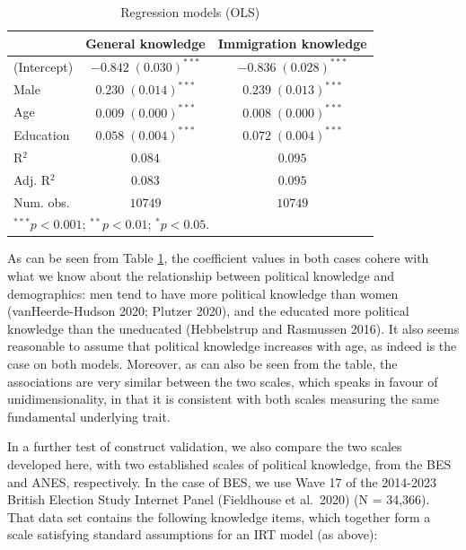 \documentclass[11pt,halfline,a4paper,]{ouparticle}
\begin{document}
\begin{table}[h!]
\caption{Regression models (OLS)}
\begin{center}
\begin{tabular}{l c c}
\hline
 & General knowledge & Immigration knowledge \\
\hline
(Intercept) & $-0.842 \; (0.030)^{***}$ & $-0.836 \; (0.028)^{***}$ \\
Male        & $0.230 \; (0.014)^{***}$  & $0.239 \; (0.013)^{***}$  \\
Age         & $0.009 \; (0.000)^{***}$  & $0.008 \; (0.000)^{***}$  \\
Education   & $0.058 \; (0.004)^{***}$  & $0.072 \; (0.004)^{***}$  \\
\hline
R$^2$       & $0.084$                   & $0.095$                   \\
Adj. R$^2$  & $0.083$                   & $0.095$                   \\
Num. obs.   & $10749$                   & $10749$                   \\
\hline
\multicolumn{3}{l}{\scriptsize{$^{***}p<0.001$; $^{**}p<0.01$; $^{*}p<0.05$.}}
\end{tabular}
\label{tab:4}
\end{center}
\end{table}

As can be seen from Table \ref{tab:4}, the coefficient values in both
cases cohere with what we know about the relationship between political
knowledge and demographics: men tend to have more political knowledge
than women (vanHeerde-Hudson 2020; Plutzer 2020), and the educated more
political knowledge than the uneducated (Hebbelstrup and Rasmussen
2016). It also seems reasonable to assume that political knowledge
increases with age, as indeed is the case on both models. Moreover, as
can also be seen from the table, the associations are very similar
between the two scales, which speaks in favour of unidimensionality, in
that it is consistent with both scales measuring the same fundamental
underlying trait.

In a further test of construct validation, we also compare the two
scales developed here, with two established scales of political
knowledge, from the BES and ANES, respectively. In the case of BES, we
use Wave 17 of the 2014-2023 British Election Study Internet Panel
(Fieldhouse et al.~2020) (N = 34,366). That data set contains the
following knowledge items, which together form a scale satisfying
standard assumptions for an IRT model (as above):
\end{document}
